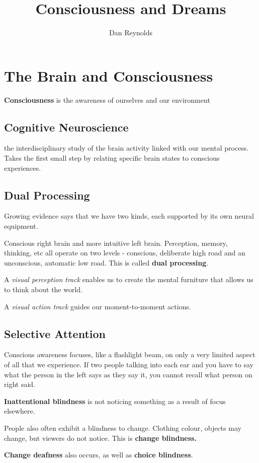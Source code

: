 \documentclass[12pt]{article}
\title{Consciousness and Dreams}
\author{Dan Reynolds}
\begin{document}
\maketitle
\section*{The Brain and Consciousness}
\textbf{Consciousness} is the awareness of ourselves and our environment
\subsection*{Cognitive Neuroscience}
the interdisciplinary study of the brain activity linked with our mental process. Takes the first small step by relating specific brain states to conscious experiences. 

\subsection*{Dual Processing}
Growing evidence says that we have two kinds, each supported by its own neural equipment. 

Conscious right brain and more intuitive left brain. Perception, memory, thinking, etc all operate on two levels - conscious, deliberate high road and an unconscious, automatic low road. This is called \textbf{dual processing}.

A \textit{visual perception track} enables us to create the mental furniture that allows us to think about the world.

A \textit{visual action track} guides our moment-to-moment actions. 

\subsection*{Selective Attention}
Conscious awareness focuses, like a flashlight beam, on only a very limited aspect of all that we experience. If two people talking into each ear and you have to say what the person in the left says as they say it, you cannot recall what person on right said.

\textbf*{Inattentional blindness} is not noticing something as a result of focus elsewhere.

People also often exhibit a blindness to change. Clothing colour, objects may change, but viewers do not notice. This is \textbf{change blindness.}

\textbf{Change deafness} also occurs, as well as \textbf{choice blindness}.
\end{document}

